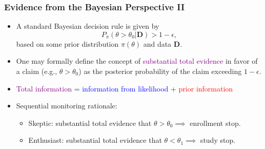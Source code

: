 \documentclass{beamer}
\begin{document}
\begin{frame} \frametitle{Evidence from the Bayesian Perspective II}
	\begin{itemize}
			
	  \item A standard Bayesian decision rule is given by
					\[ P_\pi\left( \theta > \theta_0 \big| \mathbf{D} \right) > 1 - \epsilon, \]
					based on some prior distribution $\pi\left( \theta \right)$ and data $\mathbf{D}$.
					
		\vspace{0.3cm}			
		\item One may formally define the concept of \textcolor{purple}{substantial total evidence} 
		      in favor of a claim (e.g., $\theta > \theta_0$) as the posterior probability of the claim 
					exceeding $1 - \epsilon$.	
							
	  \vspace{0.3cm}
		\item \textcolor{purple}{Total information} =  \textcolor{blue}{information from likelihood} + 
		\textcolor{red}{prior information}						
							
			\vspace{0.30cm}
			\item Sequential monitoring rationale:
				\begin{itemize}
				 \vspace{0.30cm}
				 \item Skeptic: substantial total evidence that $\theta> \theta_0 \implies$ enrollment stop.
				
				 \vspace{0.30cm}
				 \item Enthusiast: substantial total evidence that $\theta < \theta_1 \implies$ study stop.	
				\end{itemize}
				
					

  \end{itemize}
\end{frame}
\end{document}
